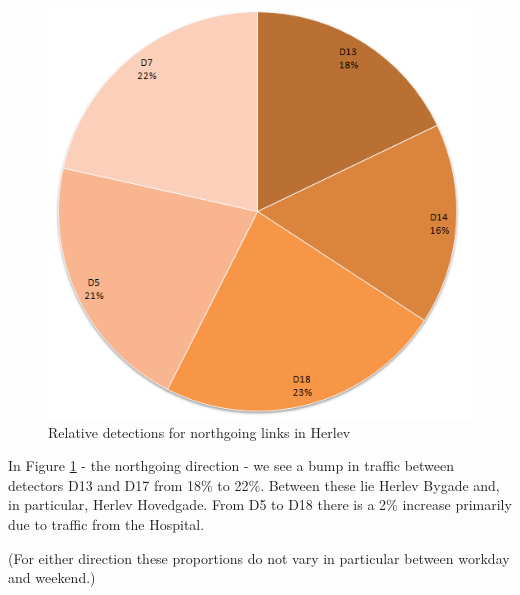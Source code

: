 \begin{figure}[!ht]
\begin{center}
\includegraphics[scale=0.4]{herlev_northgoing_detectors.png} 
\end{center}
\caption{Relative detections for northgoing links in Herlev}
\label{fig:herlev_southgoing}
\end{figure}

In Figure \ref{fig:herlev_southgoing} - the northgoing direction - we see a bump in traffic between detectors D13 and D17 from 18\% to 22\%. Between these lie Herlev Bygade and, in particular, Herlev Hovedgade. From D5 to D18 there is a 2\% increase primarily due to traffic from the Hospital.

(For either direction these proportions do not vary in particular between workday and weekend.)
